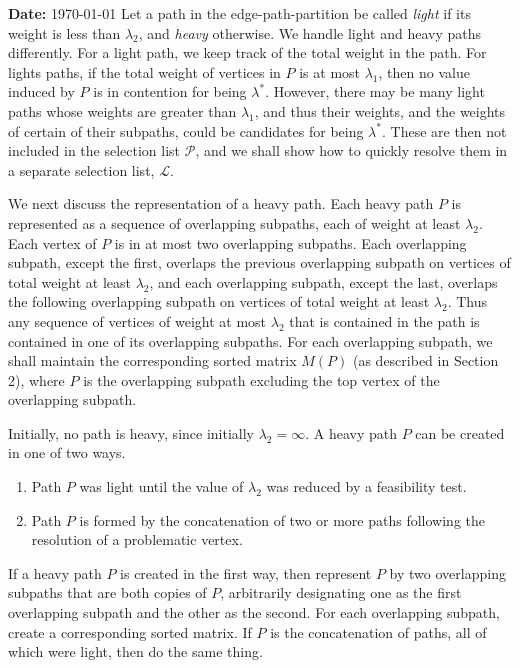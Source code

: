 \documentclass[12pt]{article}
\begin{document}

\begin{spacing}{1.5}
\noindent\textbf{Date:} \today
\vskip 0.2in\noindent
Let a path in the edge-path-partition be called {\it light} if its weight is less than $\lambda_2$, and {\it heavy} otherwise. We handle light and heavy paths differently. For a light path, we keep track of the total weight in the path. For lights paths, if the total weight of vertices in $P$ is at most $\lambda_1$, then no value induced by $P$ is in contention for being $\lambda^*$. However, there may be many light paths whose weights are greater than $\lambda_1$, and thus their weights, and the weights of certain of their subpaths, could be candidates for being $\lambda^*$. These are then not included in the selection list $\mathcal{P}$, and we shall show how to quickly resolve them in a separate selection list, $\mathcal{L}$.

We next discuss the representation of a heavy path. Each heavy path $P$ is represented as a sequence of overlapping subpaths, each of weight at least $\lambda_2$. Each vertex of $P$ is in at most two overlapping subpaths. Each overlapping subpath, except the first, overlaps the previous overlapping subpath on vertices of total weight at least $\lambda_2$, and each overlapping subpath, except the last, overlaps the following overlapping subpath on vertices of total weight at least $\lambda_2$. Thus any sequence of vertices of weight at most $\lambda_2$ that is contained in the path is contained in one of its overlapping subpaths. For each overlapping subpath, we shall maintain the corresponding sorted matrix $M(P)$ (as described in Section 2), where $P$ is the overlapping subpath excluding the top vertex of the overlapping subpath.

Initially, no path is heavy, since initially $\lambda_2=\infty$. A heavy path $P$ can be created in one of two ways.
\begin{enumerate}
\item
Path $P$ was light until the value of $\lambda_2$ was reduced by a feasibility test.
\item
Path $P$ is formed by the concatenation of two or more paths following the resolution of a problematic vertex.
\end{enumerate}

If a heavy path $P$ is created in the first way, then represent $P$ by two overlapping subpaths that are both copies of $P$, arbitrarily designating one as the first overlapping subpath and the other as the second. For each overlapping subpath, create a corresponding sorted matrix. If $P$ is the concatenation of paths, all of which were light, then do the same thing.


\end{spacing}
\end{document}
